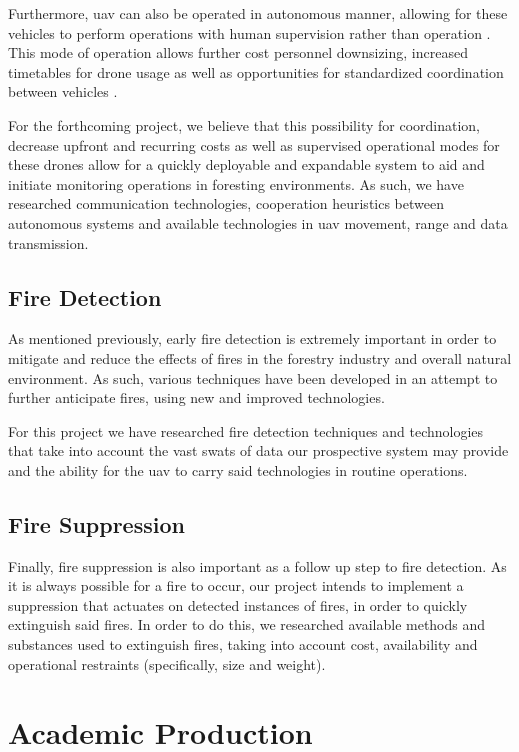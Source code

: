 \documentclass[runningheads]{llncs}
\begin{document}
Furthermore, \acrshort{uav} can also be operated in autonomous manner, allowing for these vehicles to perform operations with human supervision rather than operation .  This mode of operation allows further cost personnel downsizing, increased timetables for drone usage as well as opportunities for standardized coordination between vehicles .

For the forthcoming project, we believe that this possibility for coordination, decrease upfront and recurring costs as well as supervised operational modes for these drones allow for a quickly deployable and expandable system to aid and initiate monitoring operations in foresting environments. As such, we have researched communication technologies, cooperation heuristics between autonomous systems and available technologies in \acrshort{uav} movement, range and data transmission.

\subsection{Fire Detection}

As mentioned previously, early fire detection is extremely important in order to mitigate and reduce the effects of fires in the forestry industry and overall natural environment. As such, various techniques have been developed in an attempt to further anticipate fires, using new and improved technologies.

For this project we have researched fire detection techniques and technologies that take into account the vast swats of data our prospective system may provide and the ability for the \acrshort{uav} to carry said technologies in routine operations.


\subsection{Fire Suppression}

Finally, fire suppression is also important as a follow up step to fire detection. As it is always possible for a fire to occur, our project intends to implement a suppression that actuates on detected instances of fires, in order to quickly extinguish said fires. In order to do this, we researched available methods and substances used to extinguish fires, taking into account cost, availability and operational restraints (specifically, size and weight).


\section{Academic Production}
\end{document}
